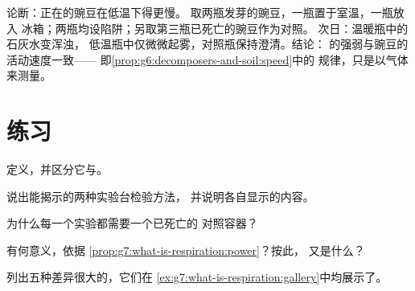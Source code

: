 \begin{example}[对低温种子应用该方法]\label{ex:g7:what-is-respiration:coldseed}
论断：正在的豌豆在低温下得更慢。
取两瓶发芽的豌豆，一瓶置于室温，一瓶放入
冰箱；两瓶均设陷阱；另取第三瓶已死亡的豌豆作为对照。
次日：温暖瓶中的石灰水变浑浊，
低温瓶中仅微微起雾，对照瓶保持澄清。结论：
的强弱与豌豆的活动速度一致——
即\cref{prop:g6:decomposers-and-soil:speed}中的
规律，只是以气体来测量。
\end{example}

\section{练习}

\begin{exercise}[$\star$]\label{exo:g7:what-is-respiration:1}
定义，并区分它与。
\end{exercise}

\begin{exercise}[$\star$]\label{exo:g7:what-is-respiration:2}
说出能揭示的两种实验台检验方法，
并说明各自显示的内容。
\end{exercise}

\begin{exercise}[$\star$]\label{exo:g7:what-is-respiration:3}
为什么每一个实验都需要一个已死亡的
对照容器？
\end{exercise}

\begin{exercise}[$\star$]\label{exo:g7:what-is-respiration:4}
有何意义，依据
\cref{prop:g7:what-is-respiration:power}？按此，
又是什么？
\end{exercise}

\begin{exercise}[$\star$]\label{exo:g7:what-is-respiration:5}
列出五种差异很大的，它们在
\cref{ex:g7:what-is-respiration:gallery}中均展示了。
\end{exercise}

